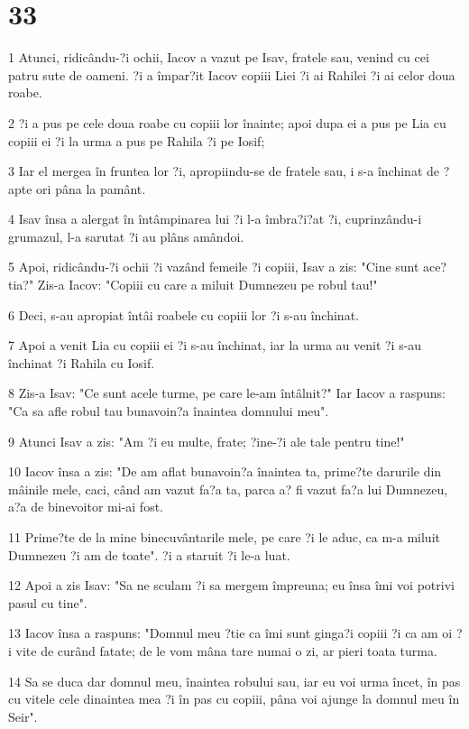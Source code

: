 \chapter{33}

\par 1 Atunci, ridicându-?i ochii, Iacov a vazut pe Isav, fratele sau, venind cu cei patru sute de oameni. ?i a împar?it Iacov copiii Liei ?i ai Rahilei ?i ai celor doua roabe.
\par 2 ?i a pus pe cele doua roabe cu copiii lor înainte; apoi dupa ei a pus pe Lia cu copiii ei ?i la urma a pus pe Rahila ?i pe Iosif;
\par 3 Iar el mergea în fruntea lor ?i, apropiindu-se de fratele sau, i s-a închinat de ?apte ori pâna la pamânt.
\par 4 Isav însa a alergat în întâmpinarea lui ?i l-a îmbra?i?at ?i, cuprinzându-i grumazul, l-a sarutat ?i au plâns amândoi.
\par 5 Apoi, ridicându-?i ochii ?i vazând femeile ?i copiii, Isav a zis: "Cine sunt ace?tia?" Zis-a Iacov: "Copiii cu care a miluit Dumnezeu pe robul tau!"
\par 6 Deci, s-au apropiat întâi roabele cu copiii lor ?i s-au închinat.
\par 7 Apoi a venit Lia cu copiii ei ?i s-au închinat, iar la urma au venit ?i s-au închinat ?i Rahila cu Iosif.
\par 8 Zis-a Isav: "Ce sunt acele turme, pe care le-am întâlnit?" Iar Iacov a raspuns: "Ca sa afle robul tau bunavoin?a înaintea domnului meu".
\par 9 Atunci Isav a zis: "Am ?i eu multe, frate; ?ine-?i ale tale pentru tine!"
\par 10 Iacov însa a zis: "De am aflat bunavoin?a înaintea ta, prime?te darurile din mâinile mele, caci, când am vazut fa?a ta, parca a? fi vazut fa?a lui Dumnezeu, a?a de binevoitor mi-ai fost.
\par 11 Prime?te de la mine binecuvântarile mele, pe care ?i le aduc, ca m-a miluit Dumnezeu ?i am de toate". ?i a staruit ?i le-a luat.
\par 12 Apoi a zis Isav: "Sa ne sculam ?i sa mergem împreuna; eu însa îmi voi potrivi pasul cu tine".
\par 13 Iacov însa a raspuns: "Domnul meu ?tie ca îmi sunt ginga?i copiii ?i ca am oi ?i vite de curând fatate; de le vom mâna tare numai o zi, ar pieri toata turma.
\par 14 Sa se duca dar domnul meu, înaintea robului sau, iar eu voi urma încet, în pas cu vitele cele dinaintea mea ?i în pas cu copiii, pâna voi ajunge la domnul meu în Seir".
